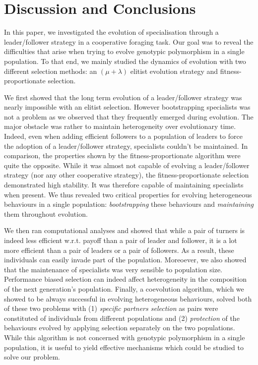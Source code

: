 \section{Discussion and Conclusions}
\label{sec:discussion}
  In this paper, we investigated the evolution of specialisation through a leader/follower strategy in a cooperative foraging task. Our goal was to reveal the difficulties that arise when trying to evolve genotypic polymorphism in a single population. To that end, we mainly studied the dynamics of evolution with two different selection methods: an \((\mu + \lambda)\) elitist evolution strategy and fitness-proportionate selection.

  We first showed that the long term evolution of a leader/follower strategy was nearly impossible with an elitist selection. However bootstrapping specialists was not a problem as we observed that they frequently emerged during evolution. The major obstacle was rather to maintain heterogeneity over evolutionary time. Indeed, even when adding efficient followers to a population of leaders to force the adoption of a leader/follower strategy, specialists couldn't be maintained. In comparison, the properties shown by the fitness-proportionate algorithm were quite the opposite. While it was almost not capable of evolving a leader/follower strategy (nor any other cooperative strategy), the fitness-proportionate selection demonstrated high stability. It was therefore capable of maintaining specialists when present. We thus revealed two critical properties for evolving heterogeneous behaviours in a single population: \emph{bootstrapping} these behaviours and \emph{maintaining} them throughout evolution.

  We then ran computational analyses and showed that while a pair of turners is indeed less efficient w.r.t. payoff than a pair of leader and follower, it is a lot more efficient than a pair of leaders or a pair of followers. As a result, these individuals can easily invade part of the population. Moreoever, we also showed that the maintenance of specialists was very sensible to population size. Performance biased selection can indeed affect heterogeneity in the composition of the next generation's population. Finally, a coevolution algorithm, which we showed to be always successful in evolving heterogeneous behaviours, solved both of these two problems with (1) \emph{specific partners selection} as pairs were constituted of individuals from different populations and (2) \emph{protection} of the behaviours evolved by applying selection separately on the two populations. While this algorithm is not concerned with genotypic polymorphism in a single population, it is useful to yield effective mechanisms which could be studied to solve our problem. 

